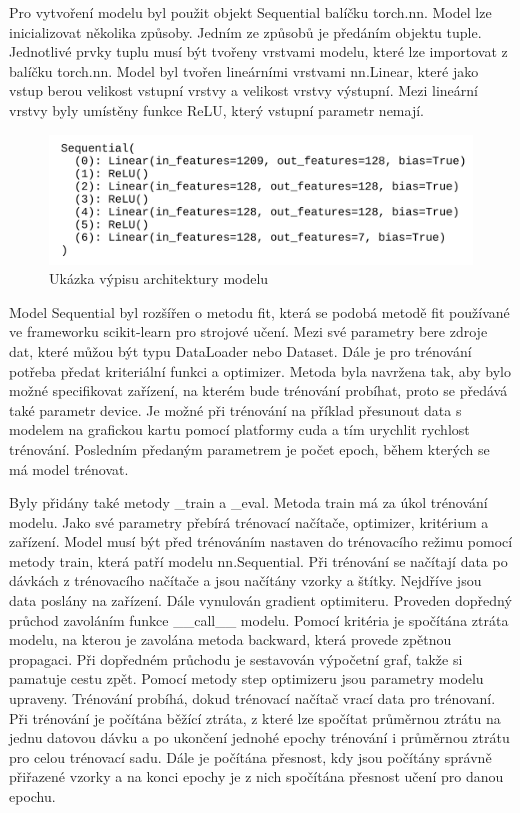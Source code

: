 \documentclass[FM,BP]{tulthesis}
\begin{document}
Pro vytvoření modelu byl použit objekt Sequential balíčku torch.nn. Model lze inicializovat několika způsoby. Jedním ze způsobů je předáním objektu tuple. Jednotlivé prvky tuplu musí být tvořeny vrstvami modelu, které lze importovat z balíčku torch.nn. Model byl tvořen lineárními vrstvami nn.Linear, které jako vstup berou velikost vstupní vrstvy a velikost vrstvy výstupní. Mezi lineární vrstvy byly umístěny funkce ReLU, který vstupní parametr nemají.

\begin{figure}[htbp]
\centerline{\includegraphics[scale=.25]{model_architecture.png}}
\caption{Ukázka výpisu architektury modelu}
\label{fig}
\end{figure}

Model Sequential byl rozšířen o metodu fit, která se podobá metodě fit používané ve frameworku scikit-learn pro strojové učení. Mezi své parametry bere zdroje dat, které můžou být typu DataLoader nebo Dataset. Dále je pro trénování potřeba předat kriteriální funkci a optimizer. Metoda byla navržena tak, aby bylo možné specifikovat zařízení, na kterém bude trénování probíhat, proto se předává také parametr device. Je možné při trénování na příklad přesunout data s modelem na grafickou kartu pomocí platformy cuda a tím urychlit rychlost trénování. Posledním předaným parametrem je počet epoch, během kterých se má model trénovat.

Byly přidány také metody \_train a \_eval. Metoda train má za úkol trénování modelu. Jako své parametry přebírá trénovací načítače, optimizer, kritérium a zařízení. Model musí být před trénováním nastaven do trénovacího režimu pomocí metody train, která patří modelu nn.Sequential.
Při trénování se načítají data po dávkách z trénovacího načítače a jsou načítány vzorky a štítky. Nejdříve jsou data poslány na zařízení. Dále vynulován gradient optimiteru. Proveden dopředný průchod zavoláním funkce \_\_call\_\_ modelu. Pomocí kritéria je spočítána ztráta modelu, na kterou je zavolána metoda backward, která provede zpětnou propagaci. Při dopředném průchodu je sestavován výpočetní graf, takže si pamatuje cestu zpět. Pomocí metody step optimizeru jsou parametry modelu upraveny. Trénování probíhá, dokud trénovací načítač vrací data pro trénovaní. Při trénování je počítána běžící ztráta, z které lze spočítat průměrnou ztrátu na jednu datovou dávku a po ukončení jednohé epochy trénování i průměrnou ztrátu pro celou trénovací sadu. Dále je počítána přesnost, kdy jsou počítány správně přiřazené vzorky a na konci epochy je z nich spočítána přesnost učení pro danou epochu.
\end{document}
